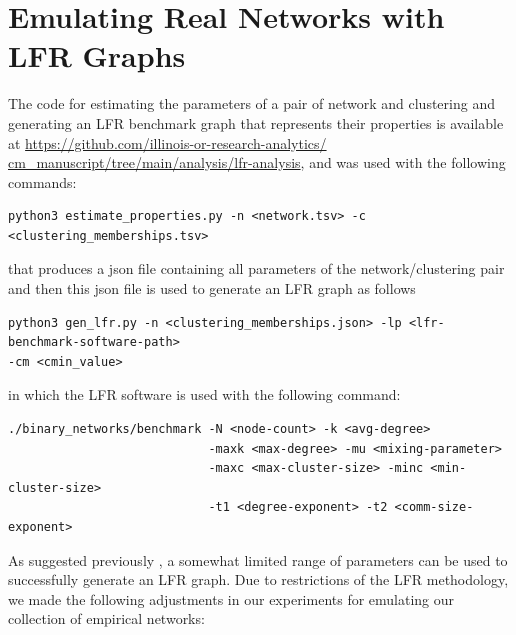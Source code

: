 \documentclass[a4paper]{article}   	%
\begin{document}
\section{Emulating Real Networks with LFR Graphs}
 The code for estimating the parameters of a pair of network and clustering and generating an LFR benchmark graph that represents their properties is available at \href{https://github.com/illinois-or-research-analytics/cm_manuscript/tree/main/analysis/lfr-analysis}{https://github.com/illinois-or-research-analytics/} \href{https://github.com/illinois-or-research-analytics/cm_manuscript/tree/main/analysis/lfr-analysis}{cm\_manuscript/tree/main/analysis/lfr-analysis}, and was used with the following commands:

\begin{lstlisting}[basicstyle=\ttfamily\small]
python3 estimate_properties.py -n <network.tsv> -c <clustering_memberships.tsv>
\end{lstlisting}
that produces a json file containing all parameters of the network/clustering pair and then this json file is used to generate an LFR graph as follows

\begin{lstlisting}[basicstyle=\ttfamily\small]
python3 gen_lfr.py -n <clustering_memberships.json> -lp <lfr-benchmark-software-path>
-cm <cmin_value>
\end{lstlisting}

in which the LFR software \citep{lancichinetti2008benchmark} is used with the following command:

\begin{lstlisting}[basicstyle=\ttfamily\small]
./binary_networks/benchmark -N <node-count> -k <avg-degree>
                            -maxk <max-degree> -mu <mixing-parameter>
                            -maxc <max-cluster-size> -minc <min-cluster-size>
                            -t1 <degree-exponent> -t2 <comm-size-exponent>
\end{lstlisting}



As suggested previously \citep{hagberg2008exploring}, a somewhat limited range of parameters can be used to successfully generate an LFR graph. Due to restrictions of the LFR methodology, we made the following adjustments in our experiments for emulating our collection of empirical networks:
\end{document}
